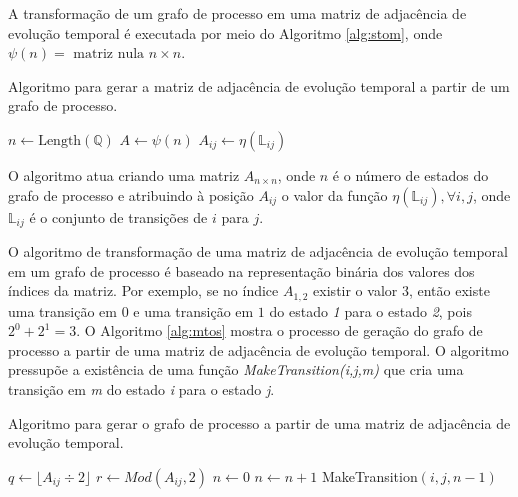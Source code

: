 \documentclass[12pt,a4paper]{article}
\begin{document}
A transformação de um grafo de processo em uma matriz de adjacência
de evolução temporal é executada por meio do Algoritmo \ref{alg:stom},
onde $\psi(n) = \mbox{ matriz nula } n \times n$.

\begin{algorithm}
\caption{Algoritmo para gerar a matriz de adjacência de evolução temporal a partir
de um grafo de processo.}
\label{alg:stom}
\begin{algorithmic}
\STATE $n \leftarrow \mbox{Length}(\mathbb{Q})$ 
\STATE $A \leftarrow \psi(n)$
        \STATE $A_{ij} \leftarrow \eta(\mathbb{\mathbb{L}}_{ij})$
    \ENDIF
\ENDFOR
\end{algorithmic}
\end{algorithm}

O algoritmo atua criando uma matriz $A_{n \times n}$, onde $n$ é o número
de estados do grafo de processo e atribuindo à posição $A_{ij}$ o valor
da função $\eta(\mathbb{L}_{ij}),\forall i,j$, onde $\mathbb{L}_{ij}$
é o conjunto de transições de $i$ para $j$.

O algoritmo de transformação de uma matriz de adjacência de evolução temporal em
um grafo de processo é baseado na representação binária dos valores dos
índices da matriz. Por exemplo, se no índice $A_{1,2}$ existir o valor
$3$, então existe uma transição em $0$ e uma transição em $1$ do estado
\emph{1} para o estado \emph{2}, pois $2^0+2^1=3$. O Algoritmo \ref{alg:mtos}
mostra o processo de geração do grafo de processo a partir de uma matriz de
adjacência de evolução temporal. O algoritmo pressupõe a existência de uma função
\emph{MakeTransition(i,j,m)} que cria uma transição em \emph{m} do estado
\emph{i} para o estado \emph{j}.

\begin{algorithm}
\caption{Algoritmo para gerar o grafo de processo a partir de uma matriz de
adjacência de evolução temporal.}
\label{alg:mtos}
\begin{algorithmic}
            \REPEAT
                \STATE $q \leftarrow \lfloor A_{ij} \div 2 \rfloor$
                \STATE $r \leftarrow Mod(A_{ij},2)$
                    \STATE $n \leftarrow 0$
                        \STATE $n \leftarrow n+1$
                    \ENDWHILE
                    \STATE MakeTransition$(i,j,n-1)$
                \ENDIF
        \ENDIF
    \ENDFOR
\ENDFOR
\end{algorithmic}
\end{algorithm}
\end{document}
